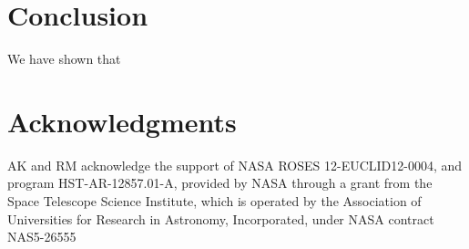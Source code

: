 \documentclass[twocolumn,useAMS,usenatbib]{mn2e}
\begin{document}
\section{Conclusion}

We have shown that 
\section*{Acknowledgments}

AK and RM acknowledge the support of NASA ROSES 12-EUCLID12-0004, and
program HST-AR-12857.01-A, provided by NASA through a grant from the
Space Telescope Science Institute, which is operated by the
Association of Universities for Research in Astronomy, Incorporated,
under NASA contract NAS5-26555


\end{document}

